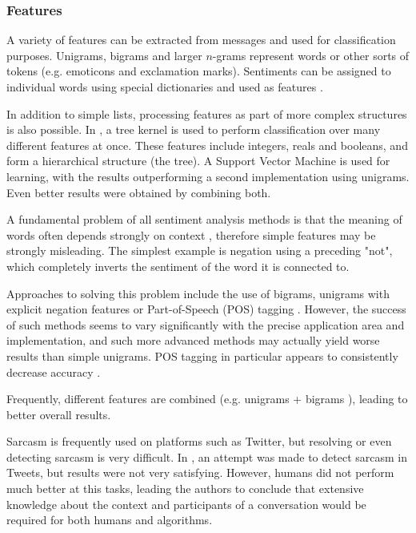 \documentclass{sig-alternate}
\begin{document}
\subsubsection{Features}

A variety of features can be extracted from messages and used for classification purposes. Unigrams, bigrams and larger $n$-grams represent words or other sorts of tokens (e.g. emoticons and exclamation marks). Sentiments can be assigned to individual words using special dictionaries and used as features \cite{kouloumpis2011twitter}.


In addition to simple lists, processing features as part of more complex structures is also possible. In \cite{agarwal2011sentiment}, a tree kernel is used to perform classification over many different features at once. These features include integers, reals and booleans, and form a hierarchical structure (the tree). A Support Vector Machine is used for learning, with the results outperforming a second implementation using unigrams. Even better results were obtained by combining both.


A fundamental problem of all sentiment analysis methods is that the meaning of words often depends strongly on context \cite{vinodhini2012sentiment}, therefore simple features may be strongly misleading. The simplest example is negation using a preceding "not", which completely inverts the sentiment of the word it is connected to.

Approaches to solving this problem include the use of bigrams, unigrams with explicit negation features \cite{go2009twitter} or Part-of-Speech (POS) tagging \cite{kouloumpis2011twitter}. However, the success of such methods seems to vary significantly with the precise application area and implementation, and such more advanced methods may actually yield worse results than simple unigrams. POS tagging in particular appears to consistently decrease accuracy \cite{agarwal2011sentiment, kouloumpis2011twitter, go2009twitter}.

Frequently, different features are combined (e.g. unigrams + bigrams \cite{go2009twitter}), leading to better overall results.

Sarcasm is frequently used on platforms such as Twitter, but resolving or even detecting sarcasm is very difficult. In \cite{gonzalez2011identifying}, an attempt was made to detect sarcasm in Tweets, but results were not very satisfying. However, humans did not perform much better at this tasks, leading the authors to conclude that extensive knowledge about the context  and participants of a conversation would be required for both humans and algorithms.
\end{document}

